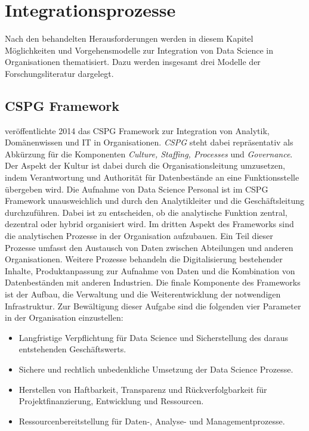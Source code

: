 \chapter[Integrationsprozesse]{Integrationsprozesse}

Nach den behandelten Herausforderungen werden in diesem Kapitel Möglichkeiten und Vorgehensmodelle zur Integration von Data Science in Organisationen thematisiert.
Dazu werden insgesamt drei Modelle der Forschungsliteratur dargelegt.

\section{CSPG Framework}

 veröffentlichte 2014 das CSPG Framework zur Integration von Analytik, Domänenwissen und IT in Organisationen.
\textit{CSPG} steht dabei repräsentativ als Abkürzung für die Komponenten \textit{Culture, Staffing, Processes} und \textit{Governance}. 
Der Aspekt der Kultur ist dabei durch die Organisationsleitung umzusetzen, indem Verantwortung und Authorität für Datenbestände an eine Funktionsstelle übergeben wird.
Die Aufnahme von Data Science Personal ist im CSPG Framework unausweichlich und durch den Analytikleiter und die Geschäftsleitung durchzuführen. 
Dabei ist zu entscheiden, ob die analytische Funktion zentral, dezentral oder hybrid organisiert wird.
Im dritten Aspekt des Frameworks sind die analytischen Prozesse in der Organisation aufzubauen.
Ein Teil dieser Prozesse umfasst den Austausch von Daten zwischen Abteilungen und anderen Organisationen.
Weitere Prozesse behandeln die Digitalisierung bestehender Inhalte, Produktanpassung zur Aufnahme von Daten und die Kombination von Datenbeständen mit anderen Industrien.
Die finale Komponente des Frameworks ist der Aufbau, die Verwaltung und die Weiterentwicklung der notwendigen Infrastruktur.
Zur Bewältigung dieser Aufgabe sind die folgenden vier Parameter in der Organisation einzustellen:

\begin{itemize}
    \item Langfristige Verpflichtung für Data Science und Sicherstellung des daraus entstehenden Geschäftswerts.
    \item Sichere und rechtlich unbedenkliche Umsetzung der Data Science Prozesse.
    \item Herstellen von Haftbarkeit, Transparenz und Rückverfolgbarkeit für Projektfinanzierung, Entwicklung und Ressourcen.
    \item Ressourcenbereitstellung für Daten-, Analyse- und Managementprozesse.
\end{itemize}

